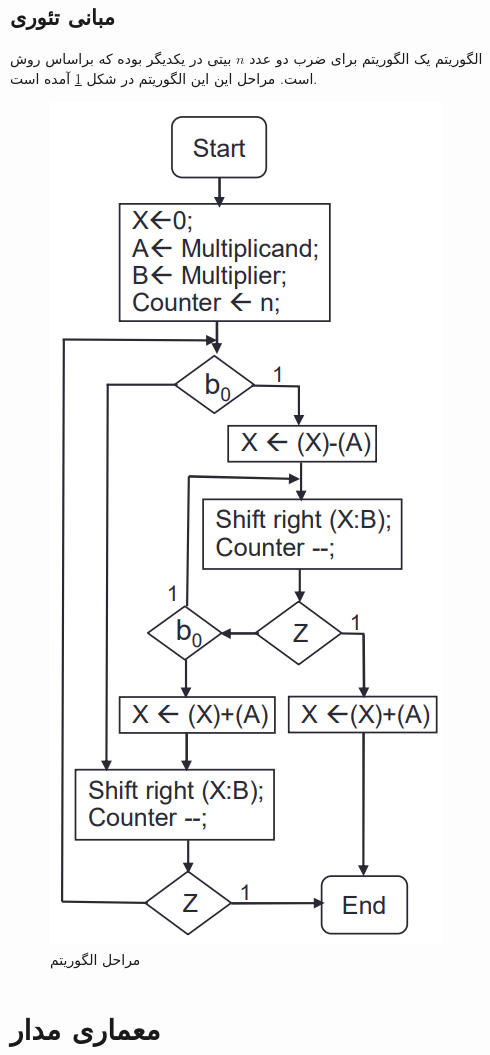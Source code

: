 \documentclass[12pt,onecolumn,a4paper,fleqn]{article}
\begin{document}
	\subsection{مبانی تئوری}
	الگوریتم 
	یک الگوریتم برای ضرب دو عدد $n$ بیتی در یکدیگر بوده که براساس روش 
	است. مراحل این این الگوریتم در شکل \ref{fig:booth-alg} آمده است.
	\begin{figure}[H]
		\centering
		\includegraphics[scale=0.8]{source/booth-alg.png}
		\caption{مراحل الگوریتم }
		\label{fig:booth-alg}
	\end{figure}
	\pagebreak
	\section{معماری مدار}
\end{document}
